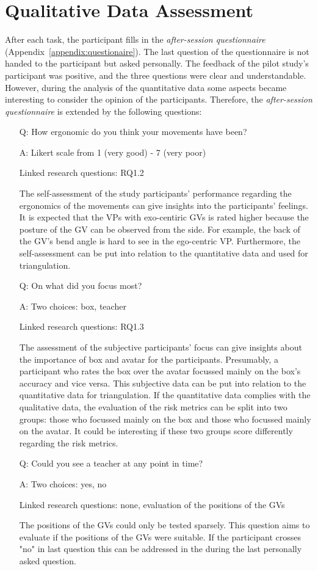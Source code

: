 \section{Qualitative Data Assessment}
\label{sec:evalQuali}
After each task, the participant fills in the \textit{after-session questionnaire} (Appendix~\ref{appendix:questionaire}). The last question of the questionnaire is not handed to the participant but asked personally. The feedback of the pilot study's participant was positive, and the three questions were clear and understandable. However, during the analysis of the quantitative data some aspects became interesting to consider the opinion of the participants. Therefore, the \textit{after-session questionnaire} is extended by the following questions:
\begin{itemize}
	\item[Q:] How ergonomic do you think your movements have been?
	\item[A:] Likert scale from 1 (very good) - 7 (very poor)
	\item[] Linked research questions: RQ1.2
	\item[] The self-assessment of the study participants' performance regarding the ergonomics of the movements can give insights into the participants' feelings. It is expected that the VPs with exo-centiric GVs is rated higher because the posture of the GV can be observed from the side. For example, the back of the GV's bend angle is hard to see in the ego-centric VP. Furthermore, the self-assessment can be put into relation to the quantitative data and used for triangulation.
	\item[Q:] On what did you focus most?
	\item[A:] Two choices: box, teacher
	\item[] Linked research questions: RQ1.3
	\item[] The assessment of the subjective participants' focus can give insights about the importance of box and avatar for the participants. Presumably, a participant who rates the box over the avatar focussed mainly on the box's accuracy and vice versa. This subjective data can be put into relation to the quantitative data for triangulation. If the quantitative data complies with the qualitative data, the evaluation of the risk metrics can be split into two groups: those who focussed mainly on the box and those who focussed mainly on the avatar. It could be interesting if these two groups score differently regarding the risk metrics.
	\item[Q:] Could you see a teacher at any point in time?
	\item[A:] Two choices: yes, no
	\item[] Linked research questions: none, evaluation of the positions of the GVs
	\item[] The positions of the GVs could only be tested sparsely. This question aims to evaluate if the positions of the GVs were suitable. If the participant crosses "no" in last question this can be addressed in the during the last personally asked question.
\end{itemize}
